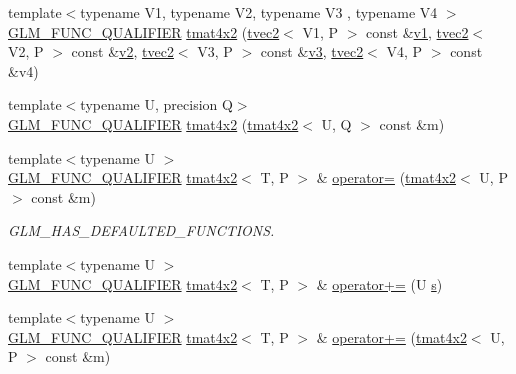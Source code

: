\begin{DoxyCompactItemize}
{\footnotesize template$<$typename V1, typename V2, typename V3 , typename V4 $>$ }\\\mbox{\hyperlink{setup_8hpp_a33fdea6f91c5f834105f7415e2a64407}{G\+L\+M\+\_\+\+F\+U\+N\+C\+\_\+\+Q\+U\+A\+L\+I\+F\+I\+ER}} \mbox{\hyperlink{structglm_1_1tmat4x2_a3d41b266dfeb276e13db820296663cea}{tmat4x2}} (\mbox{\hyperlink{structglm_1_1tvec2}{tvec2}}$<$ V1, P $>$ const \&\mbox{\hyperlink{glad_8h_a0779c3b73f9aa3a0ac5b0139b5d291d9}{v1}}, \mbox{\hyperlink{structglm_1_1tvec2}{tvec2}}$<$ V2, P $>$ const \&\mbox{\hyperlink{glad_8h_a9a09a1837922b2b806f4589096a52049}{v2}}, \mbox{\hyperlink{structglm_1_1tvec2}{tvec2}}$<$ V3, P $>$ const \&\mbox{\hyperlink{glad_8h_acc806b31cbf466ceba6555983d8b814d}{v3}}, \mbox{\hyperlink{structglm_1_1tvec2}{tvec2}}$<$ V4, P $>$ const \&v4)
\item 
{\footnotesize template$<$typename U, precision Q$>$ }\\\mbox{\hyperlink{setup_8hpp_a33fdea6f91c5f834105f7415e2a64407}{G\+L\+M\+\_\+\+F\+U\+N\+C\+\_\+\+Q\+U\+A\+L\+I\+F\+I\+ER}} \mbox{\hyperlink{structglm_1_1tmat4x2_a08e86729278cf333bbde38195810311b}{tmat4x2}} (\mbox{\hyperlink{structglm_1_1tmat4x2}{tmat4x2}}$<$ U, Q $>$ const \&m)
\item 
{\footnotesize template$<$typename U $>$ }\\\mbox{\hyperlink{setup_8hpp_a33fdea6f91c5f834105f7415e2a64407}{G\+L\+M\+\_\+\+F\+U\+N\+C\+\_\+\+Q\+U\+A\+L\+I\+F\+I\+ER}} \mbox{\hyperlink{structglm_1_1tmat4x2}{tmat4x2}}$<$ T, P $>$ \& \mbox{\hyperlink{structglm_1_1tmat4x2_ac513919fdc4d1506721e4e6bf78556a7}{operator=}} (\mbox{\hyperlink{structglm_1_1tmat4x2}{tmat4x2}}$<$ U, P $>$ const \&m)
\begin{DoxyCompactList}\small\item\em G\+L\+M\+\_\+\+H\+A\+S\+\_\+\+D\+E\+F\+A\+U\+L\+T\+E\+D\+\_\+\+F\+U\+N\+C\+T\+I\+O\+NS. \end{DoxyCompactList}\item 
{\footnotesize template$<$typename U $>$ }\\\mbox{\hyperlink{setup_8hpp_a33fdea6f91c5f834105f7415e2a64407}{G\+L\+M\+\_\+\+F\+U\+N\+C\+\_\+\+Q\+U\+A\+L\+I\+F\+I\+ER}} \mbox{\hyperlink{structglm_1_1tmat4x2}{tmat4x2}}$<$ T, P $>$ \& \mbox{\hyperlink{structglm_1_1tmat4x2_abf01335ab1627fdec0cdeabcc1779d6d}{operator+=}} (U \mbox{\hyperlink{glad_8h_af1b1d5edfea6a34daee7389b1b5810ad}{s}})
\item 
{\footnotesize template$<$typename U $>$ }\\\mbox{\hyperlink{setup_8hpp_a33fdea6f91c5f834105f7415e2a64407}{G\+L\+M\+\_\+\+F\+U\+N\+C\+\_\+\+Q\+U\+A\+L\+I\+F\+I\+ER}} \mbox{\hyperlink{structglm_1_1tmat4x2}{tmat4x2}}$<$ T, P $>$ \& \mbox{\hyperlink{structglm_1_1tmat4x2_ad0563b333d9ef8633dc748b58352fdee}{operator+=}} (\mbox{\hyperlink{structglm_1_1tmat4x2}{tmat4x2}}$<$ U, P $>$ const \&m)

\end{DoxyCompactItemize}
